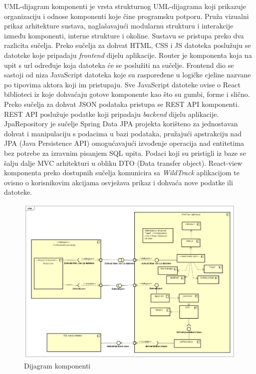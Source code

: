 		UML-dijagram komponenti je vrsta strukturnog UML-dijagrama koji
		prikazuje organizaciju i odnose komponenti koje čine programsku potporu. Pruža vizualni prikaz
		arhitekture sustava, naglašavajući modularnu strukturu i interakcije između komponenti, interne strukture i okoline.
		\newline Sustavu se pristupa preko dva razlicita sučelja. Preko sučelja za dohvat HTML, CSS i JS datoteka poslužuju se
datoteke koje pripadaju \textit{frontend} dijelu aplikacije. Router je komponenta koja na
upit s url određuje koja datoteka će se poslužiti na sučelje. Frontend dio se sastoji
od niza JavaScript datoteka koje su raspoređene u logičke cjeline nazvane po tipovima aktora koji im pristupaju. Sve JavaScript datoteke ovise o React biblioteci iz
koje dohvaćaju gotove komponente kao što su gumbi, forme i slično. Preko sučelja 
za dohvat JSON podataka pristupa se REST API komponenti. REST API poslužuje
podatke koji pripadaju \textit{backend} dijelu aplikacije. JpaRepository je sučelje Spring Data JPA projekta korišteno
za jednostavan dohvat i manipulaciju s podacima u bazi podataka, pružajući apstrakciju nad JPA 
(Java Persistence API) omogućavajući  izvođenje operacija nad entitetima bez potrebe za izravnim pisanjem SQL upita. Podaci koji su pristigli 
iz baze se šalju dalje MVC arhitekturi u obliku DTO  (Data transfer object). 
React-view komponenta preko dostupnih sučelja komunicira sa \textit{WildTrack} aplikacijom
te ovisno o korisnikovim akcijama osvježava prikaz i dohvaća nove podatke ili datoteke.
		
		\begin{figure}[H]
			\includegraphics[scale=0.4]{slike/dijagram komponenti.png}
			\centering
			\caption{Dijagram komponenti}
			\label{fig:dijagram komponenti}
		\end{figure}